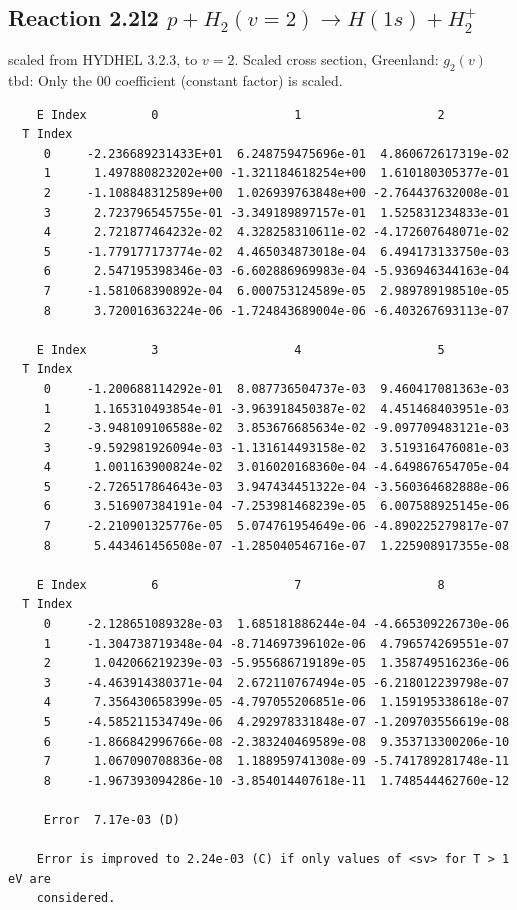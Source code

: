 \documentclass[12pt,dvipdfmx]{article}
\begin{document}
\subsection{
Reaction 2.2l2 $   p + H_2(v=2) \rightarrow H(1s) + H_2^+$}
scaled from HYDHEL 3.2.3, to $v=2$. Scaled cross section, Greenland: $g_2(v)$
tbd:
Only the 00 coefficient (constant factor) is scaled.


\begin{small}\begin{verbatim}
    E Index         0                   1                   2
  T Index
     0     -2.236689231433E+01  6.248759475696e-01  4.860672617319e-02
     1      1.497880823202e+00 -1.321184618254e+00  1.610180305377e-01
     2     -1.108848312589e+00  1.026939763848e+00 -2.764437632008e-01
     3      2.723796545755e-01 -3.349189897157e-01  1.525831234833e-01
     4      2.721877464232e-02  4.328258310611e-02 -4.172607648071e-02
     5     -1.779177173774e-02  4.465034873018e-04  6.494173133750e-03
     6      2.547195398346e-03 -6.602886969983e-04 -5.936946344163e-04
     7     -1.581068390892e-04  6.000753124589e-05  2.989789198510e-05
     8      3.720016363224e-06 -1.724843689004e-06 -6.403267693113e-07

    E Index         3                   4                   5
  T Index
     0     -1.200688114292e-01  8.087736504737e-03  9.460417081363e-03
     1      1.165310493854e-01 -3.963918450387e-02  4.451468403951e-03
     2     -3.948109106588e-02  3.853676685634e-02 -9.097709483121e-03
     3     -9.592981926094e-03 -1.131614493158e-02  3.519316476081e-03
     4      1.001163900824e-02  3.016020168360e-04 -4.649867654705e-04
     5     -2.726517864643e-03  3.947434451322e-04 -3.560364682888e-06
     6      3.516907384191e-04 -7.253981468239e-05  6.007588925145e-06
     7     -2.210901325776e-05  5.074761954649e-06 -4.890225279817e-07
     8      5.443461456508e-07 -1.285040546716e-07  1.225908917355e-08

    E Index         6                   7                   8
  T Index
     0     -2.128651089328e-03  1.685181886244e-04 -4.665309226730e-06
     1     -1.304738719348e-04 -8.714697396102e-06  4.796574269551e-07
     2      1.042066219239e-03 -5.955686719189e-05  1.358749516236e-06
     3     -4.463914380371e-04  2.672110767494e-05 -6.218012239798e-07
     4      7.356430658399e-05 -4.797055206851e-06  1.159195338618e-07
     5     -4.585211534749e-06  4.292978331848e-07 -1.209703556619e-08
     6     -1.866842996766e-08 -2.383240469589e-08  9.353713300206e-10
     7      1.067090708836e-08  1.188959741308e-09 -5.741789281748e-11
     8     -1.967393094286e-10 -3.854014407618e-11  1.748544462760e-12

     Error  7.17e-03 (D)

    Error is improved to 2.24e-03 (C) if only values of <sv> for T > 1 eV are
    considered.
\end{verbatim}\end{small}
\newpage
\end{document}
